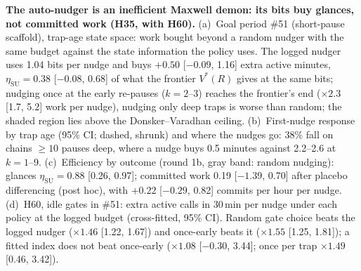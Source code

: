 \caption{\textbf{The auto-nudger is an inefficient Maxwell demon: its bits buy glances, not committed work (H35, with H60).}
(a)~Goal period \#51 (short-pause scaffold), trap-age state space: work bought beyond a random nudger with the same budget against the state information the policy uses. The logged nudger uses 1.04 bits per nudge and buys $+0.50$ [$-0.09$, 1.16] extra active minutes, $\eta_\mathrm{SU}=0.38$ [$-0.08$, 0.68] of what the frontier $V^*(R)$ gives at the same bits; nudging once at the early re-pauses ($k=2$--3) reaches the frontier's end ($\times2.3$ [1.7, 5.2] work per nudge), nudging only deep traps is worse than random; the shaded region lies above the Donsker--Varadhan ceiling.
(b)~First-nudge response by trap age (95\% CI; dashed, shrunk) and where the nudges go: 38\% fall on chains $\ge10$ pauses deep, where a nudge buys 0.5 minutes against 2.2--2.6 at $k=1$--9.
(c)~Efficiency by outcome (round 1b, gray band: random nudging): glances $\eta_\mathrm{SU}=0.88$ [0.26, 0.97]; committed work 0.19 [$-1.39$, 0.70] after placebo differencing (post hoc), with $+0.22$ [$-0.29$, 0.82] commits per hour per nudge.
(d)~H60, idle gates in \#51: extra active calls in 30\,min per nudge under each policy at the logged budget (cross-fitted, 95\% CI). Random gate choice beats the logged nudger ($\times1.46$ [1.22, 1.67]) and once-early beats it ($\times1.55$ [1.25, 1.81]); a fitted index does not beat once-early ($\times1.08$ [$-0.30$, 3.44]; once per trap $\times1.49$ [0.46, 3.42]).}
\label{fig:H35}
